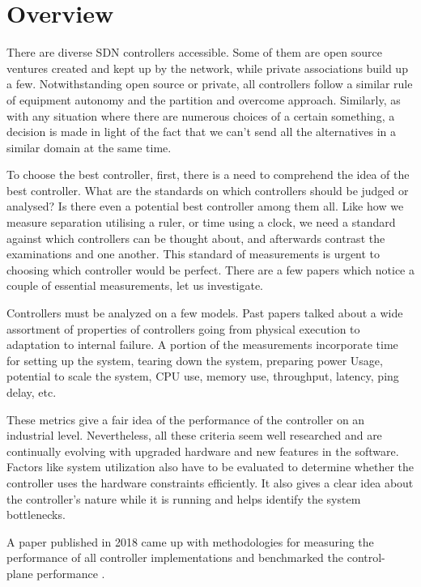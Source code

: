 \chapter{Overview}

    There are diverse SDN controllers accessible. Some of them are open source ventures created and kept up by the network, while private associations build up a few. Notwithstanding open source or private, all controllers follow a similar rule of equipment autonomy and the partition and overcome approach. Similarly, as with any situation where there are numerous choices of a certain something, a decision is made in light of the fact that we can't send all the alternatives in a similar domain at the same time.
 
    To choose the best controller, first, there is a need to comprehend the idea of the best controller. What are the standards on which controllers should be judged or analysed? Is there even a potential best controller among them all. Like how we measure separation utilising a ruler, or time using a clock, we need a standard against which controllers can be thought about, and afterwards contrast the examinations and one another. This standard of measurements is urgent to choosing which controller would be perfect. There are a few papers which notice a couple of essential measurements, let us investigate.
    
   Controllers must be analyzed on a few models. Past papers talked about a wide assortment of properties of controllers going from physical execution to adaptation to internal failure. A portion of the measurements incorporate time for setting up the system, tearing down the system, preparing power Usage, potential to scale the system, CPU use, memory use, throughput, latency, ping delay, etc.
    
    These metrics give a fair idea of the performance of the controller on an industrial level. Nevertheless, all these criteria seem well researched and are continually evolving with upgraded hardware and new features in the software. Factors like system utilization also have to be evaluated to determine whether the controller uses the hardware constraints efficiently. It also gives a clear idea about the controller's nature while it is running and helps identify the system bottlenecks.
    
    A paper published in 2018 came up with methodologies for measuring the performance of all controller implementations and benchmarked the control- plane performance \cite{rfc8456}.
    
